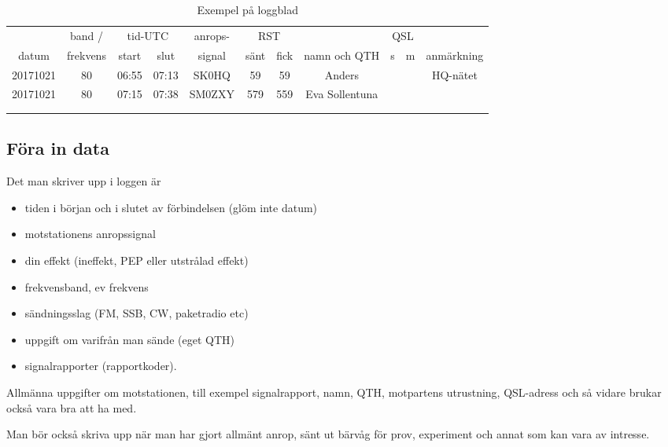 \begin{table}[h!]
  \vspace*{2cm}
  
  \qquad
  \begin{tabular}{|c|c|c|c|c|c|c|c|c|c|c|}
    \hline
    & band / & \multicolumn{2}{|c|}{tid-UTC} & anrops- & \multicolumn{2}{|c|}{RST} & &
                                                                                       \multicolumn{2}{|c|}{QSL} & \\
    datum & frekvens & start & slut & signal & sänt & fick & namn och QTH & s & m & anmärkning \\
    \hline
    \hline
    20171021 & 80 & 06:55 & 07:13 & SK0HQ & 59 & 59 & Anders & & & HQ-nätet \\
    \hline
    20171021 & 80 & 07:15 & 07:38 & SM0ZXY & 579 & 559 & Eva Sollentuna & & & \\
    \hline
    & & & & & & & & & & \\
    \hline
    & & & & & & & & & & \\
    \hline
  \end{tabular}
  \caption{Exempel på loggblad}
  \label{tab:loggblad}
\end{table}

\subsection{Föra in data}

Det man skriver upp i loggen är
\begin{itemize}
  \item tiden i början och i slutet av förbindelsen (glöm inte datum)
  \item motstationens anropssignal
  \item din effekt (ineffekt, PEP eller utstrålad effekt)
  \item frekvensband, ev frekvens
  \item sändningsslag (FM, SSB, CW, paketradio etc)
  \item uppgift om varifrån man sände (eget QTH)
  \item signalrapporter (rapportkoder).
\end{itemize}

Allmänna uppgifter om motstationen, till exempel signalrapport, namn, QTH,
motpartens utrustning, QSL-adress och så vidare brukar också vara bra att ha med.

Man bör också skriva upp när man har gjort allmänt anrop, sänt ut
bärvåg för prov, experiment och annat som kan vara av intresse.

